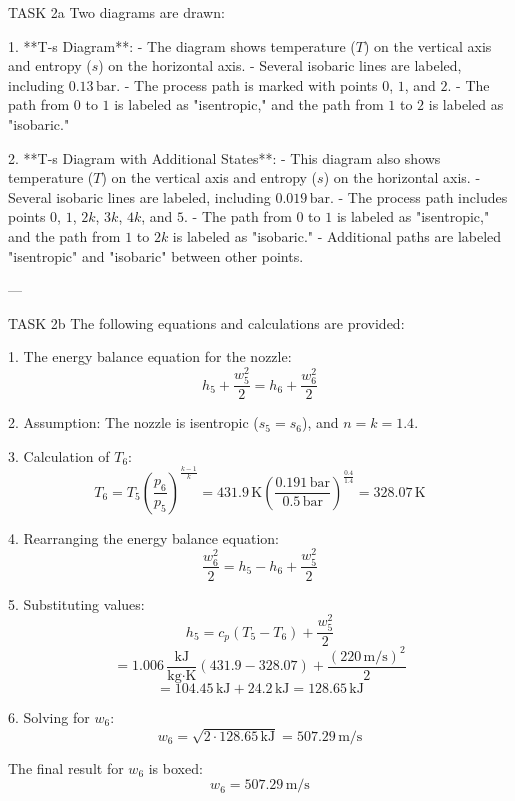 TASK 2a  
Two diagrams are drawn:  

1. **T-s Diagram**:  
   - The diagram shows temperature (\( T \)) on the vertical axis and entropy (\( s \)) on the horizontal axis.  
   - Several isobaric lines are labeled, including \( 0.13 \, \text{bar} \).  
   - The process path is marked with points \( 0 \), \( 1 \), and \( 2 \).  
   - The path from \( 0 \) to \( 1 \) is labeled as "isentropic," and the path from \( 1 \) to \( 2 \) is labeled as "isobaric."  

2. **T-s Diagram with Additional States**:  
   - This diagram also shows temperature (\( T \)) on the vertical axis and entropy (\( s \)) on the horizontal axis.  
   - Several isobaric lines are labeled, including \( 0.019 \, \text{bar} \).  
   - The process path includes points \( 0 \), \( 1 \), \( 2k \), \( 3k \), \( 4k \), and \( 5 \).  
   - The path from \( 0 \) to \( 1 \) is labeled as "isentropic," and the path from \( 1 \) to \( 2k \) is labeled as "isobaric."  
   - Additional paths are labeled "isentropic" and "isobaric" between other points.  

---

TASK 2b  
The following equations and calculations are provided:  

1. The energy balance equation for the nozzle:  
   \[
   h_5 + \frac{w_5^2}{2} = h_6 + \frac{w_6^2}{2}
   \]

2. Assumption: The nozzle is isentropic (\( s_5 = s_6 \)), and \( n = k = 1.4 \).  

3. Calculation of \( T_6 \):  
   \[
   T_6 = T_5 \left( \frac{p_6}{p_5} \right)^{\frac{k-1}{k}} = 431.9 \, \text{K} \left( \frac{0.191 \, \text{bar}}{0.5 \, \text{bar}} \right)^{\frac{0.4}{1.4}} = 328.07 \, \text{K}
   \]

4. Rearranging the energy balance equation:  
   \[
   \frac{w_6^2}{2} = h_5 - h_6 + \frac{w_5^2}{2}
   \]

5. Substituting values:  
   \[
   h_5 = c_p (T_5 - T_6) + \frac{w_5^2}{2}
   \]
   \[
   = 1.006 \, \frac{\text{kJ}}{\text{kg·K}} (431.9 - 328.07) + \frac{(220 \, \text{m/s})^2}{2}
   \]
   \[
   = 104.45 \, \text{kJ} + 24.2 \, \text{kJ} = 128.65 \, \text{kJ}
   \]

6. Solving for \( w_6 \):  
   \[
   w_6 = \sqrt{2 \cdot 128.65 \, \text{kJ}} = 507.29 \, \text{m/s}
   \]  

The final result for \( w_6 \) is boxed:  
\[
w_6 = 507.29 \, \text{m/s}
\]